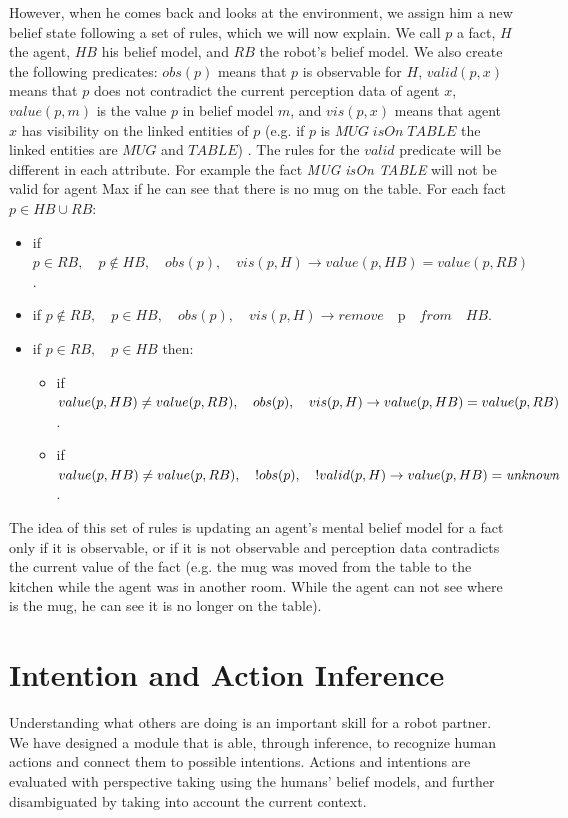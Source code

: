 However, when he comes back and looks at the environment, we assign him a new belief state following a set of rules, which we will now explain. We call $p$ a fact, $H$ the agent, $HB$ his belief model, and $RB$ the robot's belief model. We also create the following predicates: $obs(p)$ means that $p$ is observable for $H$, $valid(p,x)$ means that $p$ does not contradict the current perception data of agent $x$, $value(p,m)$ is the value $p$ in belief model $m$, and $vis(p,x)$ means that agent $x$ has visibility on the linked entities of $p$ (e.g. if $p$ is $MUG\; isOn \; TABLE$ the linked entities are $MUG$ and $TABLE$) . The rules for the $valid$ predicate will be different in each attribute. For example the fact \textit{MUG isOn TABLE} will not be valid for agent Max if he can see that there is no mug on the table. For each fact $p\in HB \cup RB$:
\begin{itemize}
\item if $p \in RB, \quad p\not\in HB,\quad obs(p),\quad vis(p,H) \rightarrow value(p,HB)=value(p,RB)$.
\item if $p \not \in RB,\quad p\in HB,\quad obs(p),\quad vis(p,H) \rightarrow remove\quad $p$ \quad from \quad HB$.
\item if $p\in RB,\quad p\in HB$ then:
	\begin{itemize}
      \item if $value(p,HB)\neq value(p,RB),\\ \quad obs(p),\quad vis(p,H) \rightarrow \\ value(p,HB)=value(p,RB)$.
      \item if $value(p,HB)\neq value(p,RB),\\ \quad !obs(p),\quad !valid(p,H) \rightarrow \\ value(p,HB)=\textit{unknown}$.
	\end{itemize}
\end{itemize}
The idea of this set of rules is updating an agent's mental belief model for a fact only if it is observable, or if it is not observable and perception data contradicts the current value of the fact (e.g. the mug was moved from the table to the kitchen while the agent was in another room. While the agent can not see where is the mug, he can see it is no longer on the table).



\section{Intention and Action Inference}
\label{sec:situation_assessment-intention_recognition}
Understanding what others are doing is an important skill for a robot partner. We have designed a module that is able, through inference, to recognize human actions and connect them to possible intentions. Actions and intentions are evaluated with perspective taking using the humans' belief models, and further disambiguated by taking into account the current context.

